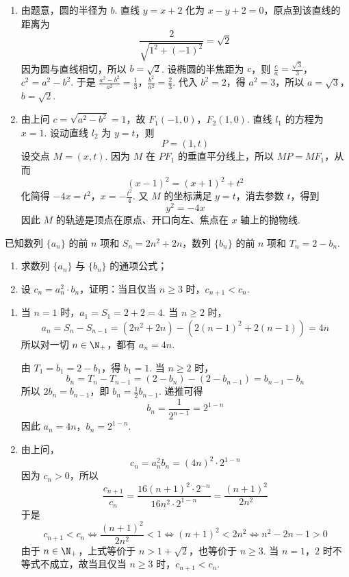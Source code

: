 \begin{solution}
\begin{enumerate}
\item 由题意，圆的半径为 \(b\). 直线 \(y=x+2\) 化为 \(x-y+2=0\)，原点到该直线的距离为
\[
\frac{2}{\sqrt{1^2+(-1)^2}}=\sqrt{2}
\]
因为圆与直线相切，所以 \(b=\sqrt{2}\). 设椭圆的半焦距为 \(c\)，则
\(\frac{c}{a}=\frac{\sqrt{3}}{3}\)，\(c^2=a^2-b^2\).
于是
\(\frac{a^2-b^2}{a^2}=\frac{1}{3}\)，\(\frac{b^2}{a^2}=\frac{2}{3}\).
代入 \(b^2=2\)，得 \(a^2=3\)，所以
\(a=\sqrt{3}\)，\(b=\sqrt{2}\).
\item 由上问 \(c=\sqrt{a^2-b^2}=1\)，故 \(F_{1}(-1,0)\)，\(F_{2}(1,0)\). 直线 \(l_{1}\) 的方程为 \(x=1\). 设动直线 \(l_{2}\) 为 \(y=t\)，则
\[
P=(1,t)
\]
设交点 \(M=(x,t)\). 因为 \(M\) 在 \(PF_{1}\) 的垂直平分线上，所以 \(MP=MF_{1}\)，从而
\[
(x-1)^2=(x+1)^2+t^2
\]
化简得
\(-4x=t^2\)，\(x=-\frac{t^2}{4}\).
又 \(M\) 的坐标满足 \(y=t\)，消去参数 \(t\)，得到
\[
y^2=-4x
\]
因此 \(M\) 的轨迹是顶点在原点、开口向左、焦点在 \(x\) 轴上的抛物线.
\end{enumerate}
\end{solution}


\begin{problem}
已知数列 \(\{a_n\}\) 的前 \(n\) 项和 \(S_{n} = 2n^{2} + 2n\)，数列 \(\{b_n\}\) 的前 \(n\) 项和 \(T_{n} = 2 - b_{n}\).
\begin{enumerate}
\item 求数列 \( \{a_{n}\} \) 与 \( \{b_{n}\} \) 的通项公式；
\item 设 \(c_{n} = a_{n}^{2} \cdot b_{n}\)，证明：当且仅当 \(n \geqslant 3\) 时，\(c_{n+1} < c_{n}\).
\end{enumerate}
\end{problem}

\begin{solution}
\begin{enumerate}
\item 当 \(n=1\) 时，\(a_1=S_1=2+2=4\). 当 \(n\geqslant2\) 时，
\[
a_n=S_n-S_{n-1}
=\left(2n^2+2n\right)-\left(2(n-1)^2+2(n-1)\right)
=4n
\]
所以对一切 \(n\in\N_+\)，都有 \(a_n=4n\).

由 \(T_1=b_1=2-b_1\)，得 \(b_1=1\). 当 \(n\geqslant2\) 时，
\[
b_n=T_n-T_{n-1}
=\left(2-b_n\right)-\left(2-b_{n-1}\right)
=b_{n-1}-b_n
\]
所以 \(2b_n=b_{n-1}\)，即 \(b_n=\frac{1}{2}b_{n-1}\). 递推可得
\[
b_n=\frac{1}{2^{n-1}}=2^{1-n}
\]
因此
\(a_n=4n\)，\(b_n=2^{1-n}\).
\item 由上问，
\[
c_n=a_n^2b_n=(4n)^2\cdot2^{1-n}
\]
因为 \(c_n>0\)，所以
\[
\frac{c_{n+1}}{c_n}
=\frac{16(n+1)^2\cdot2^{-n}}{16n^2\cdot2^{1-n}}
=\frac{(n+1)^2}{2n^2}
\]
于是
\[
c_{n+1}<c_n
\Longleftrightarrow
\frac{(n+1)^2}{2n^2}<1
\Longleftrightarrow
(n+1)^2<2n^2
\Longleftrightarrow
n^2-2n-1>0
\]
由于 \(n\in\N_+\)，上式等价于 \(n>1+\sqrt{2}\)，也等价于 \(n\geqslant3\). 当 \(n=1\)，\(2\) 时不等式不成立，故当且仅当 \(n\geqslant3\) 时，\(c_{n+1}<c_n\).
\end{enumerate}
\end{solution}

